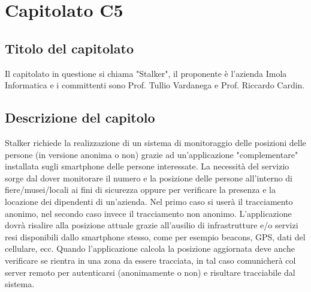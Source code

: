 \section{Capitolato C5}
\subsection{Titolo del capitolato}
Il capitolato in questione si chiama "Stalker", il proponente \`e l'azienda Imola Informatica e i committenti sono Prof. Tullio Vardanega e Prof. Riccardo Cardin.

\subsection{Descrizione del capitolo}
Stalker richiede la realizzazione di un sistema di monitoraggio delle posizioni delle persone (in versione anonima o non) grazie ad un'applicazione "complementare" installata sugli smartphone delle persone interessate. La necessit\`a del servizio sorge dal dover monitorare il numero e la posizione delle persone all'interno di fiere/musei/locali ai fini di sicurezza oppure per verificare la presenza e la locazione dei dipendenti di un'azienda. Nel primo caso si user\`a il tracciamento anonimo, nel secondo caso invece il tracciamento non anonimo. L'applicazione dovr\`a risalire alla posizione attuale grazie all'ausilio di infrastrutture e/o servizi resi disponibili dallo smartphone stesso, come per esempio beacons, GPS, dati del cellulare, ecc. Quando l'applicazione calcola la posizione aggiornata deve anche verificare se rientra in una zona da essere tracciata, in tal caso comunicher\`a col server remoto per autenticarsi (anonimamente o non) e risultare tracciabile dal sistema.

